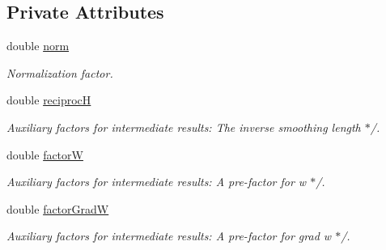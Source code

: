 \subsection*{Private Attributes}
\begin{CompactItemize}
\item 
\hypertarget{classBetaSpline_3cc93fb702c723e280f4c55aa7422def}{
double \hyperlink{classBetaSpline_3cc93fb702c723e280f4c55aa7422def}{norm}}
\label{classBetaSpline_3cc93fb702c723e280f4c55aa7422def}

\begin{CompactList}\small\item\em Normalization factor. \item\end{CompactList}\item 
\hypertarget{classBetaSpline_ca1e84910928d93dc2b7f4586f1102ac}{
double \hyperlink{classBetaSpline_ca1e84910928d93dc2b7f4586f1102ac}{reciprocH}}
\label{classBetaSpline_ca1e84910928d93dc2b7f4586f1102ac}

\begin{CompactList}\small\item\em Auxiliary factors for intermediate results: The inverse smoothing length $\ast$/. \item\end{CompactList}\item 
\hypertarget{classBetaSpline_06df50a142cacc03bfd3168cc6ae1f57}{
double \hyperlink{classBetaSpline_06df50a142cacc03bfd3168cc6ae1f57}{factorW}}
\label{classBetaSpline_06df50a142cacc03bfd3168cc6ae1f57}

\begin{CompactList}\small\item\em Auxiliary factors for intermediate results: A pre-factor for w $\ast$/. \item\end{CompactList}\item 
\hypertarget{classBetaSpline_0b285867c4f1d4b9fced5847650a47f8}{
double \hyperlink{classBetaSpline_0b285867c4f1d4b9fced5847650a47f8}{factorGradW}}
\label{classBetaSpline_0b285867c4f1d4b9fced5847650a47f8}

\begin{CompactList}\small\item\em Auxiliary factors for intermediate results: A pre-factor for grad w $\ast$/. \item\end{CompactList}\end{CompactItemize}


